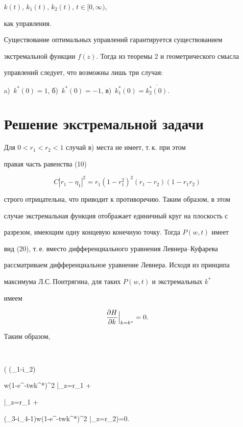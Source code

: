 $k(t)$, $k_1(t)$, $k_2(t)$, $t\in [0,\infty)$,


как управления.


Существование оптимальных управлений гарантируется существованием


экстремальной функции $f(z)$. Тогда из теоремы 2 и геометрического смысла


управлений следует, что возможны лишь три случая:


a)~$k^*(0)=1$, б)~$k^*(0) =-1$, в)~$k_1^*(0)=\overline{k_2^*(0)}$.





\section{Решение экстремальной задачи}





Для $0 < r_1 < r_2 < 1$ случай в) места не имеет, т.\,к. при этом


правая часть равенства (10)


$$


C|r_1-\eta_1|^2=r_1(1-r_1^2)^2(r_1-r_2)(1-r_1r_2)


$$


строго отрицательна, что приводит к противоречию. Таким образом, в этом


случае экстремальная функция отображает единичный круг на плоскость с


разрезом, имеющим одну концевую конечную точку. Тогда $P(w,t)$ имеет


вид (20), т.\,е. вместо дифференциального уравнения Левнера--Куфарева


рассматриваем дифференциальное уравнение Левнера. Исходя из принципа


максимума Л.С.\,Понтрягина, для таких $P(w,t)$ и экстремальных $k^*$


имеем


$$


\pde{H}{k}\Big|_{k=k^*}=0.


$$


Таким образом,


$$


\re \biggl( (\psi_1-i\psi_2)


\frac w{(1-e^{-t}wk^*)^2} \Big|_{z=r_1} +


 \Big|_{z=r_1} +


(\psi_3-i\psi_4-1)\frac w{(1-e^{-t}wk^*)^2} \Big|_{z=r_2}\biggr)=0.


